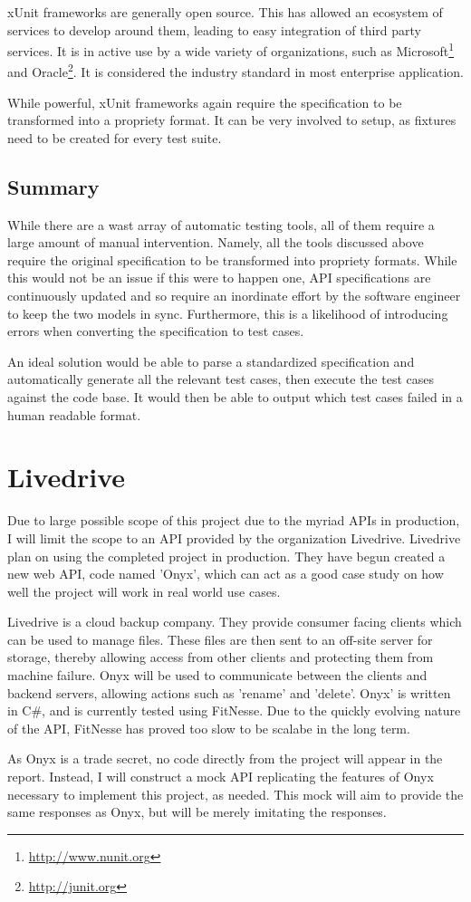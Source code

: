 xUnit frameworks are generally open source. This has allowed an ecosystem of services to develop around them, leading to easy integration of third party services. It is in active use by a wide variety of organizations, such as Microsoft\footnote{\url{http://www.nunit.org}} and Oracle\footnote{\url{http://junit.org}}. It is considered the industry standard in most enterprise application.

While powerful, xUnit frameworks again require the specification to be transformed into a propriety format. It can be very involved to setup, as fixtures need to be created for every test suite.


\subsection{Summary}

While there are a wast array of automatic testing tools, all of them require a large amount of manual intervention. Namely, all the tools discussed above require the original specification to be transformed into propriety formats. While this would not be an issue if this were to happen one, API specifications are continuously updated and so require an inordinate effort by the software engineer to keep the two models in sync. Furthermore, this is a likelihood of introducing errors when converting the specification to test cases.

An ideal solution would be able to parse a standardized specification and automatically generate all the relevant test cases, then execute the test cases against the code base. It would then be able to output which test cases failed in a human readable format.


\section{Livedrive}

Due to large possible scope of this project due to the myriad APIs in production, I will limit the scope to an API provided by the organization Livedrive. Livedrive plan on using the completed project in production. They have begun created a new web API, code named 'Onyx', which can act as a good case study on how well the project will work in real world use cases.

Livedrive is a cloud backup company. They provide consumer facing clients which can be used to manage files. These files are then sent to an off-site server for storage, thereby allowing access from other clients and protecting them from machine failure. Onyx will be used to communicate between the clients and backend servers, allowing actions such as 'rename' and 'delete'. Onyx' is written in C\#, and is currently tested using FitNesse. Due to the quickly evolving nature of the API, FitNesse has proved too slow to be scalabe in the long term.

As Onyx is a trade secret, no code directly from the project will appear in the report. Instead, I will construct a mock API replicating the features of Onyx necessary to implement this project, as needed. This mock will aim to provide the same responses as Onyx, but will be merely imitating the responses.